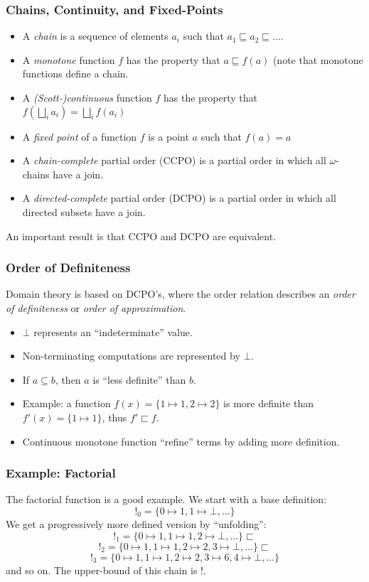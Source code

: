 \documentclass{beamer}
\begin{document}
\begin{frame}
  \frametitle{Chains, Continuity, and Fixed-Points}
  \begin{itemize}
    \item A \emph{chain} is a sequence of elements $a_i$ such that
      $a_1 \sqsubseteq a_2 \sqsubseteq \ldots$.
    \item A \emph{monotone} function $f$ has the property that $a
      \sqsubseteq f(a)$ (note that monotone functions define a chain.
    \item A \emph{(Scott-)continuous} function $f$ has the property
      that $f(\bigsqcup_ia_i) = \bigsqcup_if(a_i)$
    \item A \emph{fixed point} of a function $f$ is a point $a$ such
      that $f(a) = a$
    \item A \emph{chain-complete} partial order (CCPO) is a partial
      order in which all $\omega$-chains have a join.
    \item A \emph{directed-complete} partial order (DCPO) is a
      partial order in which all directed subsets have a join.
  \end{itemize}
  An important result is that CCPO and DCPO are equivalent.
\end{frame}

\begin{frame}
  \frametitle{Order of Definiteness}
  Domain theory is based on DCPO's, where the order relation describes
  an \emph{order of definiteness} or \emph{order of approximation}.
  \begin{itemize}
    \item $\bot$ represents an ``indeterminate'' value.
    \item Non-terminating computations are represented by $\bot$.
    \item If $a \subseteq b$, then $a$ is ``less definite'' than $b$.
    \item Example: a function $f(x) = \{ 1 \mapsto 1, 2 \mapsto 2 \}$ is
      more definite than $f'(x) = \{ 1 \mapsto 1 \}$, thus $f' \sqsubset f$.
    \item Continuous monotone function ``refine'' terms by adding more
      definition.
  \end{itemize}
\end{frame}

\begin{frame}
  \frametitle{Example: Factorial}
  The factorial function is a good example.  We start with a base definition:
  \[!_0 = \{ 0 \mapsto 1, 1 \mapsto \bot, \ldots \}\]
  We get a progressively more defined version by ``unfolding'':
  \[!_1 = \{ 0 \mapsto 1, 1 \mapsto 1, 2 \mapsto \bot, \ldots \} \sqsubset\]
  \[!_2 = \{ 0 \mapsto 1, 1 \mapsto 1, 2 \mapsto 2, 3 \mapsto \bot, \ldots \} \sqsubset\]
  \[!_3 = \{ 0 \mapsto 1, 1 \mapsto 1, 2 \mapsto 2, 3 \mapsto 6, 4 \mapsto \bot, \ldots \} \]
  and so on.  The upper-bound of this chain is $!$.
\end{frame}
\end{document}
